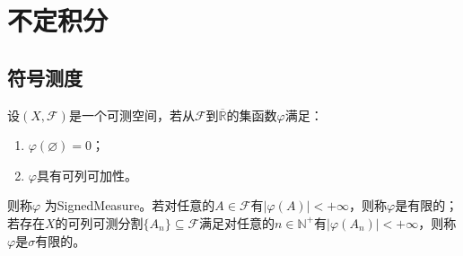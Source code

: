 \section{不定积分}

\subsection{符号测度}
\begin{definition}
	设$(X,\mathscr{F})$是一个可测空间，若从$\mathscr{F}$到$\overline{\mathbb{R}}$的集函数$\varphi$满足：
	\begin{enumerate}
		\item $\varphi(\varnothing)=0$；
		\item $\varphi$具有可列可加性。
	\end{enumerate}
	则称$\varphi$	为\gls{SignedMeasure}。若对任意的$A\in\mathscr{F}$有$|\varphi(A)|<+\infty$，则称$\varphi$是有限的；若存在$X$的可列可测分割$\{A_n\}\subseteq\mathscr{F}$满足对任意的$n\in\mathbb{N}^+$有$|\varphi(A_n)|<+\infty$，则称$\varphi$是$\sigma$有限的。
\end{definition}
